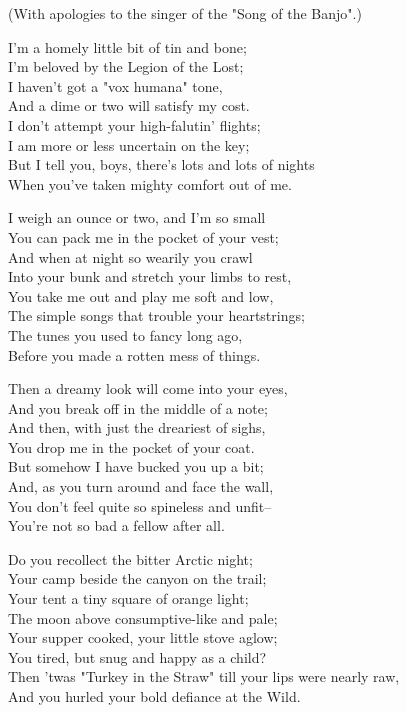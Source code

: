 
\begin{poemblock}
(With apologies to the singer of the "Song of the Banjo".)

I'm a homely little bit of tin and bone;\\
\idt I'm beloved by the Legion of the Lost;\\
I haven't got a "vox humana" tone,\\
\idt And a dime or two will satisfy my cost.\\
I don't attempt your high-falutin' flights;\\
\idt I am more or less uncertain on the key;\\
But I tell you, boys, there's lots and lots of nights\\
\idt When you've taken mighty comfort out of me.

I weigh an ounce or two, and I'm so small\\
\idt You can pack me in the pocket of your vest;\\
And when at night so wearily you crawl\\
\idt Into your bunk and stretch your limbs to rest,\\
You take me out and play me soft and low,\\
\idt The simple songs that trouble your heartstrings;\\
The tunes you used to fancy long ago,\\
\idt Before you made a rotten mess of things.

Then a dreamy look will come into your eyes,\\
\idt And you break off in the middle of a note;\\
And then, with just the dreariest of sighs,\\
\idt You drop me in the pocket of your coat.\\
But somehow I have bucked you up a bit;\\
\idt And, as you turn around and face the wall,\\
You don't feel quite so spineless and unfit--\\
\idt You're not so bad a fellow after all.

Do you recollect the bitter Arctic night;\\
\idt Your camp beside the canyon on the trail;\\
Your tent a tiny square of orange light;\\
\idt The moon above consumptive-like and pale;\\
Your supper cooked, your little stove aglow;\\
\idt You tired, but snug and happy as a child?\\
Then 'twas "Turkey in the Straw" till your lips were nearly raw,\\
\idt And you hurled your bold defiance at the Wild.


\end{poemblock}
